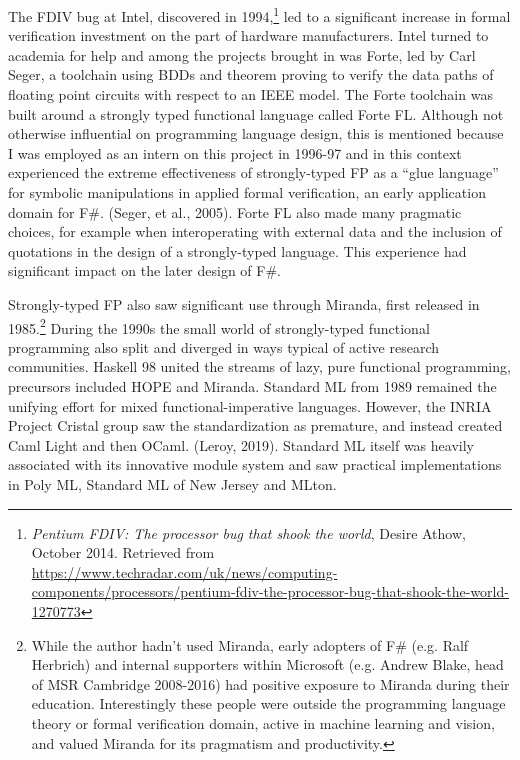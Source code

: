 \documentclass[acmsmall]{acmart}\settopmatter{}
\begin{document}
The FDIV bug at Intel, discovered in 1994,\footnote{\textit{Pentium FDIV: The processor bug that shook the world}, Desire Athow, October 2014. Retrieved
from \url{https://www.techradar.com/uk/news/computing-components/processors/pentium-fdiv-the-processor-bug-that-shook-the-world-1270773}}  led to a
significant increase in formal verification investment on the part of hardware manufacturers. Intel turned to academia for help and among the projects brought
in was Forte, led by Carl Seger, a toolchain using BDDs and theorem proving to verify the data paths of floating point circuits with respect to an IEEE model.
The Forte toolchain was built around a strongly typed functional language called Forte FL. Although not otherwise influential on programming language design, this
is mentioned because I was employed as an intern on this project in 1996-97 and in this context experienced the extreme effectiveness of strongly-typed FP
as a “glue language” for symbolic manipulations in applied formal verification, an early application domain for F\#. (Seger, et al., 2005). Forte FL also made
many pragmatic choices, for example when interoperating with external data and the inclusion of quotations in the design of a strongly-typed language. This experience
had significant impact on the later design of F\#.

Strongly-typed FP also saw significant use through Miranda, first released in 1985.\footnote{While the author hadn’t used Miranda, early adopters of
F\# (e.g. Ralf Herbrich) and internal supporters within Microsoft (e.g. Andrew Blake, head of MSR Cambridge 2008-2016) had positive exposure to Miranda
during their education. Interestingly these people were outside the programming language theory or formal verification domain, active in machine learning and vision, and
valued Miranda for its pragmatism and productivity.}  During the 1990s the small world of strongly-typed functional programming also split and diverged in ways typical
of active research communities.  Haskell 98 united the streams of lazy, pure functional programming, precursors included HOPE and Miranda.  Standard ML from 1989 remained
the unifying effort for mixed functional-imperative languages. However, the INRIA Project Cristal group saw the standardization as premature, and instead created
Caml Light and then OCaml. (Leroy, 2019). Standard ML itself was heavily associated with its innovative module system and saw practical implementations in Poly ML, Standard
ML of New Jersey and MLton.
\end{document}
